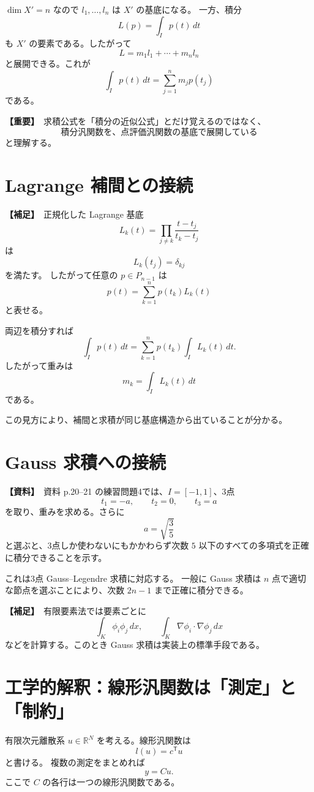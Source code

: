 \documentclass[a4paper,11pt]{ltjsarticle}
\newcommand{\R}{\mathbb{R}}
\newcommand{\sourceitem}{\textbf{【資料】}}
\newcommand{\suppitem}{\textbf{【補足】}}
\newcommand{\highimportance}{\textbf{【重要】}}
\begin{document}
$\dim X'=n$ なので $l_1,\dots,l_n$ は $X'$ の基底になる。
一方、積分
\[
L(p)=\int_Ip(t)\,dt
\]
も $X'$ の要素である。したがって
\[
L=m_1l_1+\cdots+m_nl_n
\]
と展開できる。これが
\[
\int_Ip(t)\,dt
=\sum_{j=1}^nm_jp(t_j)
\]
である。

\highimportance\ 求積公式を「積分の近似公式」とだけ覚えるのではなく、
\[
\boxed{\text{積分汎関数を、点評価汎関数の基底で展開している}}
\]
と理解する。

\section{Lagrange 補間との接続}

\suppitem\ 正規化した Lagrange 基底
\[
L_k(t)=\prod_{j\ne k}\frac{t-t_j}{t_k-t_j}
\]
は
\[
L_k(t_j)=\delta_{kj}
\]
を満たす。
したがって任意の $p\in P_{n-1}$ は
\[
p(t)=\sum_{k=1}^np(t_k)L_k(t)
\]
と表せる。

両辺を積分すれば
\[
\int_Ip(t)\,dt
=\sum_{k=1}^np(t_k)\int_IL_k(t)\,dt.
\]
したがって重みは
\[
\boxed{m_k=\int_IL_k(t)\,dt}
\]
である。

この見方により、補間と求積が同じ基底構造から出ていることが分かる。

\section{Gauss 求積への接続}

\sourceitem\ 資料 p.20--21 の練習問題4では、$I=[-1,1]$、3点
\[
t_1=-a,\qquad t_2=0,\qquad t_3=a
\]
を取り、重みを求める。さらに
\[
a=\sqrt{\frac35}
\]
と選ぶと、3点しか使わないにもかかわらず次数 $5$ 以下のすべての多項式を正確に積分できることを示す。

これは3点 Gauss--Legendre 求積に対応する。
一般に Gauss 求積は $n$ 点で適切な節点を選ぶことにより、次数 $2n-1$ まで正確に積分できる。

\suppitem\ 有限要素法では要素ごとに
\[
\int_K \phi_i\phi_j\,dx,
\qquad
\int_K \nabla\phi_i\cdot\nabla\phi_j\,dx
\]
などを計算する。このとき Gauss 求積は実装上の標準手段である。

\section{工学的解釈：線形汎関数は「測定」と「制約」}

有限次元離散系 $u\in\R^N$ を考える。線形汎関数は
\[
l(u)=c^\mathsf{T}u
\]
と書ける。
複数の測定をまとめれば
\[
y=Cu.
\]
ここで $C$ の各行は一つの線形汎関数である。
\end{document}
